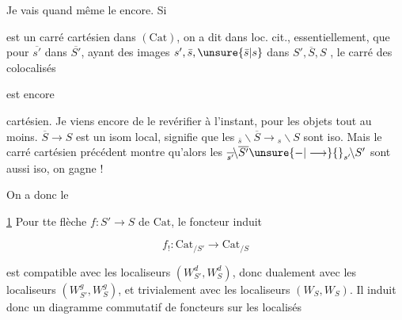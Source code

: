 
Je vais quand même le  encore. Si


est un carré cartésien dans $(\mathrm{Cat})$, on a dit dans loc. cit., essentiellement, que pour $\overline{s'}$ dans $\overline{S'}$, ayant des images $s',\bar s,\unsure{\bar s|s}$ dans $S',\overline S,S$ , le carré des colocalisés


est encore

cartésien. Je viens encore de le revérifier à l'instant, pour les objets tout au moins.   $\overline S\longrightarrow S$ est un isom local, signifie que les $ {}_{\bar s}\!\backslash\overline S\longrightarrow {}_{s}\!\backslash S$ sont iso. Mais le carré cartésien précédent montre qu'alors les $ {}_{\overline{s'}}\!\backslash\overline{S'}\unsure{\mathord{-}|\longrightarrow} {}_{s'}\!\backslash S'$ sont aussi iso, on gagne !

On a donc le

\uline{  1} Pour tte flèche $f:S'\longrightarrow S$ de $\mathrm{Cat}$, le foncteur induit

\[
f_!:\mathrm{Cat}_{/S'}\longrightarrow\mathrm{Cat}_{/S}
\]

est compatible avec les localiseurs $(W^d_{S'},W^d_S)$, donc dualement avec les localiseurs $(W^g_{S'},W^g_S)$, et trivialement avec les localiseurs $(W_S,W_S)$. Il induit donc un diagramme commutatif de foncteurs sur les localisés

